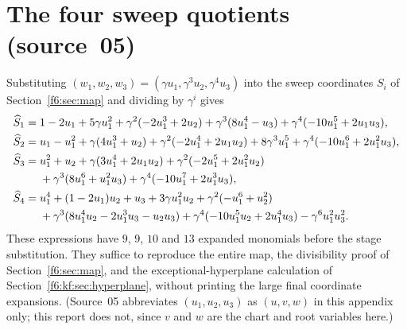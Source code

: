 \documentclass[11pt,a4paper]{article}
\theoremstyle{definition}
\newcommand{\src}[1]{\textup{(source~#1)}}
\begin{document}
\section{The four sweep quotients \src{05}}
\label{f6:kf:app:polynomials}
Substituting $(w_1,w_2,w_3)=(\gamma u_1,\gamma^3u_2,\gamma^4u_3)$ into the
sweep coordinates $S_i$ of Section~\ref{f6:sec:map} and dividing by
$\gamma^i$ gives
\begin{align}
\widehat S_1={}&1-2u_1+5\gamma u_1^2+\gamma^2(-2u_1^3+2u_2)
 +\gamma^3(8u_1^4-u_3)+\gamma^4(-10u_1^5+2u_1u_3),\label{f6:kf:eq:E1}\\
\widehat S_2={}&u_1-u_1^2+\gamma(4u_1^3+u_2)+\gamma^2(-2u_1^4+2u_1u_2)
 +8\gamma^3u_1^5+\gamma^4(-10u_1^6+2u_1^2u_3),\label{f6:kf:eq:E2}\\
\widehat S_3={}&u_1^2+u_2+\gamma(3u_1^4+2u_1u_2)+\gamma^2(-2u_1^5+2u_1^2u_2)\notag\\
 &+\gamma^3(8u_1^6+u_1^2u_3)+\gamma^4(-10u_1^7+2u_1^3u_3),\label{f6:kf:eq:E3}\\
\widehat S_4={}&u_1^4+(1-2u_1)u_2+u_3+3\gamma u_1^2u_2+\gamma^2(-u_1^6+u_2^2)\notag\\
 &+\gamma^3(8u_1^4u_2-2u_1^3u_3-u_2u_3)+\gamma^4(-10u_1^5u_2+2u_1^4u_3)
 -\gamma^6u_1^2u_3^2.\label{f6:kf:eq:E4}
\end{align}
These expressions have $9$, $9$, $10$ and $13$ expanded monomials before the
stage substitution. They suffice to reproduce the entire map, the
divisibility proof of Section~\ref{f6:sec:map}, and the exceptional-hyperplane
calculation of Section~\ref{f6:kf:sec:hyperplane}, without printing the large
final coordinate expansions. (Source~05 abbreviates $(u_1,u_2,u_3)$ as
$(u,v,w)$ in this appendix only; this report does not, since $v$ and $w$ are
the chart and root variables here.)

\end{document}
